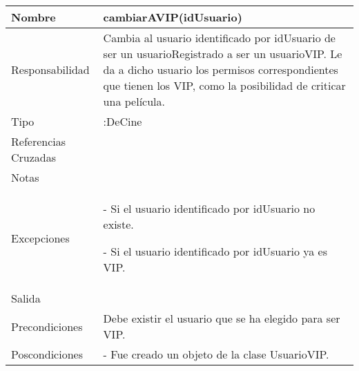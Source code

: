 \documentclass{article}
\begin{document}
\begin{table}[h]
\begin{tabular}{|l|l|l|l|l|l|}
\hline
\multicolumn{2}{|p{3cm}|}{Nombre} & \multicolumn{3}{p{8cm}|}{\textbf{cambiarAVIP(idUsuario)}}\\
\hline
\multicolumn{2}{|p{3cm}|}{Responsabilidad} & \multicolumn{4}{p{8cm}|}{Cambia al usuario identificado por idUsuario de ser un usuarioRegistrado a ser un usuarioVIP. Le da a dicho usuario los permisos correspondientes que tienen los VIP, como la posibilidad de criticar una película.} \\
\hline
\multicolumn{2}{|p{3cm}|}{Tipo} & \multicolumn{4}{p{8cm}|}{:DeCine} \\
\hline
\multicolumn{2}{|p{3cm}|}{Referencias Cruzadas} & \multicolumn{4}{p{8cm}|}{} \\
\hline
\multicolumn{2}{|p{3cm}|}{Notas} & \multicolumn{4}{p{8cm}|}{} \\
\hline
\multicolumn{2}{|p{3cm}|}{Excepciones} & \multicolumn{4}{p{8cm}|}{- Si el usuario identificado por idUsuario no existe.

- Si el usuario identificado por idUsuario ya es VIP.
} \\
\hline
\multicolumn{2}{|p{3cm}|}{Salida} & \multicolumn{4}{p{8cm}|}{} \\
\hline
\multicolumn{2}{|p{3cm}|}{Precondiciones} & \multicolumn{4}{p{8cm}|}{Debe existir el usuario que se ha elegido para ser VIP.} \\
\hline
\multicolumn{2}{|p{3cm}|}{Poscondiciones} & \multicolumn{4}{p{8cm}|}{- Fue creado un objeto de la clase UsuarioVIP.} \\
\hline
\end{tabular}
\end{table}
\end{document}
